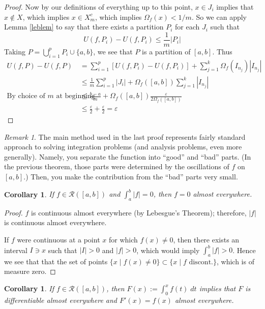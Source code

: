 \documentclass[12pt]{article}
\theoremstyle{plain}
\newtheorem{cor}[thm]{Corollary}
\theoremstyle{definition}
\theoremstyle{remark}
\newtheorem*{rmk}{Remark}
\begin{document}
\begin{proof}
Now by our definitions of everything up to this point, $x\in J_i$ implies that $x\not\in X$, which implies $x\in X^c_m$, which implies $\Omega_f(x) < 1/m$. So we can apply Lemma \ref{leblem} to say that there exists a partition $P_i$ for each $J_i$ such that 
\[ 
    U(f,P_i) - U(f,P_i) \leq \frac{1}{m}|P_i|
\]
Taking $P = \bigcup_{i=1}^p P_i \cup \{a,b\}$, we see that $P$ is a partition of $[a,b]$. Thus
\begin{align*}
    U(f,P) - U(f,P) &= \sum^p_{i=1} \left[
        U(f,P_i) - U(f,P_i)\right] + \sum^k_{j=1}
        \Omega_f(I_{n_j}) |I_{n_j}| \\
    &\leq \frac{1}{m} \sum^p_{i=1} |J_i| 
        + \Omega_f([a,b]) \sum^k_{j=1} |I_{n_j}| \\
    \text{By choice of $m$ at beginning} \quad 
        &\leq \frac{b-a}{m} + \Omega_f([a,b]) 
        \frac{\varepsilon}{2\Omega_f([a,b])} \\
    &\leq \frac{\varepsilon}{2} + \frac{\varepsilon}{2} =
        \varepsilon
\end{align*}
\end{proof}

\begin{rmk}
The main method used in the last proof represents fairly standard approach to solving integration problems (and analysis problems, even more generally).  Namely, you separate the function into ``good'' and ``bad'' parts. (In the previous theorem, those parts were determined by the oscillations of $f$ on $[a,b]$.) Then, you make the contribution from the ``bad'' parts very small.
\end{rmk}

\begin{cor}
If $f\in\mathscr{R}([a,b])$ and $\int^b_a |f| = 0$, then $f=0$ almost everywhere.
\end{cor}

\begin{proof}
$f$ is continuous almost everywhere (by Lebesgue's Theorem); therefore, $|f|$ is continuous almost everywhere. 

If $f$ were continuous at a point $x$ for which $f(x)\neq 0$, then there exists an interval $I\ni x$ such that $|I|>0$ and $|f|>0$, which would imply $\int^b_a |f| > 0$. Hence we see that that the set of points $\{x \; | \; f(x)\neq 0\} \subset \{x \; | \; f \text{ discont.}\}$, which is of measure zero.
\end{proof}

\begin{cor}
If $f\in\mathscr{R}([a,b])$, then $F(x):=\int^x_0 f(t) \; dt$ implies that $F$ is differentiable almost everywhere and $F'(x)=f(x)$ almost everywhere.
\end{cor}
\end{document}
